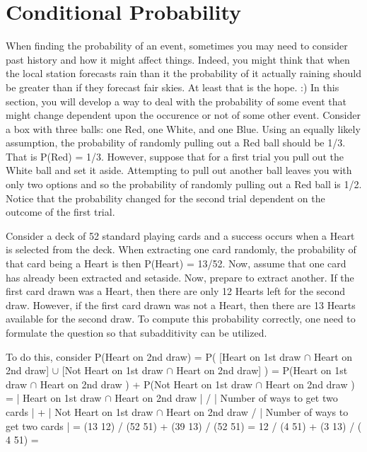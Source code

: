 \documentclass[10pt,]{book}
\theoremstyle{plain}
\theoremstyle{definition}
\theoremstyle{definition}
\theoremstyle{definition}
\numberwithin{equation}{section}
\begin{document}
\section[{Conditional Probability}]{Conditional Probability}\label{section-20}
\typeout{************************************************}
\typeout{************************************************}
When finding the probability of an event, sometimes you may need to consider past history and how it might affect things. Indeed, you might think that when the local station forecasts rain than it the probability of it actually raining should be greater than if they forecast fair skies. At least that is the hope. :)  In this section, you will develop a way to deal with the probability of some event that might change dependent upon the occurence or not of some other event.
  Consider a box with three balls: one Red, one White, and one Blue.  Using an equally likely assumption, the probability of randomly pulling out a Red ball should be 1/3.  That is P(Red) = 1/3.  However, suppose that for a first trial you pull out the White ball and set it aside. Attempting to pull out another ball leaves you with only two options and so the probability of randomly pulling out a Red ball is 1/2. Notice that the probability changed for the second trial dependent on the outcome of the first trial.%
\par

	Consider a deck of 52 standard playing cards and a success occurs when a Heart is selected from the deck. When extracting one card randomly, the probability	of that card being a Heart is then P(Heart) = 13/52. Now, assume that one card has already been extracted and setaside.  Now, prepare to extract another. If the first card drawn was a Heart, then there are only 12 Hearts left for the second draw. However, if the first card drawn was not a Heart, then there are 13 Hearts available for the second draw. To compute this probability correctly, one need to formulate the question so that subadditivity can  be utilized.%
\par

	To do this, consider 
	P(Heart on 2nd draw) 
	= P( [Heart on 1st draw \(\cap\) Heart on 2nd draw] \(\cup\) [Not Heart on 1st draw \(\cap\) Heart on 2nd draw] )
	= P(Heart on 1st draw \(\cap\) Heart on 2nd draw ) + P(Not Heart on 1st draw \(\cap\) Heart on 2nd draw )
	= | Heart on 1st draw \(\cap\) Heart on 2nd draw | / | Number of ways to get two cards |
	+ | Not Heart on 1st draw \(\cap\) Heart on 2nd draw / | Number of ways to get two cards |
	= (13 12) / (52 51) + (39 13) / (52 51) = 12 / (4 51) + (3 13) / ( 4 51) =  
\end{document}
